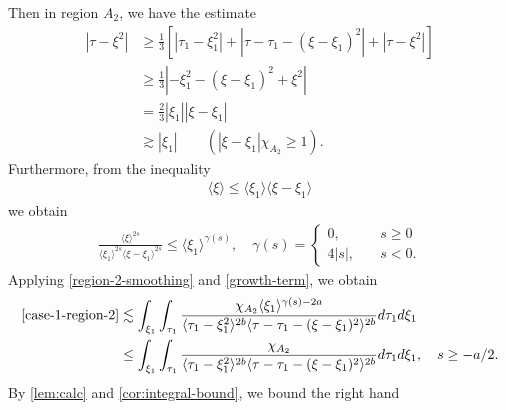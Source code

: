 \documentclass[12pt,reqno]{amsart}
\numberwithin{equation}{section}  %
\begin{document}
%
%
Then in region $A_{2}$, we have the estimate
%
%
\begin{equation}
\begin{split}
  | \tau - \xi^{2} |
  & \ge \frac{1}{3}\left[ | \tau_{1} - \xi_{1}^{2} | + | \tau -
  \tau_{1} - (\xi - \xi_{1})^{2}
  | + | \tau - \xi^{2} | \right]
  \\
  & \ge \frac{1}{3} | - \xi_{1}^{2} - (\xi - \xi_{1})^{2} + \xi^{2} |
  \\
  & = \frac{2}{3} | \xi_{1} | | \xi - \xi_{1} |
  \\
  & \gtrsim | \xi_{1} | \qquad (| \xi - \xi_{1} |\chi_{A_{2}} \ge 1).
\end{split}
\label{region-2-smoothing}
\end{equation}
%
%
Furthermore, from the inequality
%
%
\begin{equation*}
\begin{split}
  \langle \xi \rangle  \le \langle \xi_{1} \rangle \langle \xi - \xi_{1} \rangle 
\end{split}
\end{equation*}
%
we obtain
%
%
\begin{equation}
  \label{growth-term}
\begin{split}
  \frac{\langle \xi \rangle ^{2s}}{\langle \xi_{1} \rangle ^{2s} \langle \xi -
  \xi_{1} \rangle ^{2s}} \le \langle \xi_{1} \rangle ^{\gamma(s)},
  \quad 
  \gamma(s) = 
  \begin{cases} 0, \quad & s \ge 0
    \\
    4|s|, \quad & s < 0.
  \end{cases}
\end{split}
\end{equation}
Applying \eqref{region-2-smoothing} and \eqref{growth-term}, we obtain 
%
%
\begin{equation*}
\begin{split}
  \eqref{case-1-region-2}
  & \lesssim
  \int_{\xi_{1}} \int_{\tau_{1}}  \frac{\chi_{A_{2}} \langle \xi_{1} \rangle
  ^{\gamma(s) -2a}}{ 
  \langle \tau_{1} - \xi_{1}^{2} \rangle^{2b} \langle  \tau - \tau_{1} -
    (\xi - \xi_{1})^{2} \rangle^{2b} }
    d \tau_1 d \xi_{1}
    \\
    & \le \int_{\xi_{1}} \int_{\tau_{1}}  \frac{\chi_{A_{2}}}{ 
    \langle \tau_{1} - \xi_{1}^{2} \rangle^{2b} \langle  \tau - \tau_{1} -
    (\xi - \xi_{1})^{2} \rangle^{2b} }
    d \tau_1 d \xi_{1}, \quad s \ge -a/2.
  \end{split}
\end{equation*}
%
%
By \cref{lem:calc} and \cref{cor:integral-bound}, we bound the right hand
\end{document}
